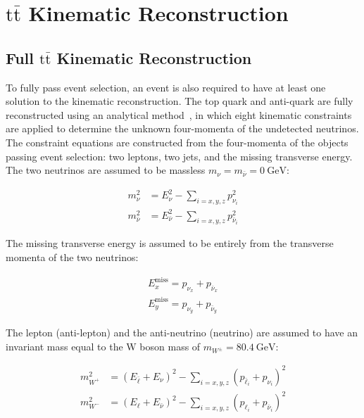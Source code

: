 \clearpage
\section{\ensuremath{\mathrm{t\bar{t}}} Kinematic Reconstruction}

\subsection{Full \ensuremath{\mathrm{t\bar{t}}} Kinematic Reconstruction}
To fully pass event selection, an event is also required to have at least one solution to the \ttbar kinematic reconstruction.
The top quark and anti-quark are fully reconstructed using an analytical method~\cite{Sonnenschein:2006ud}, in which eight kinematic constraints are applied to determine the unknown four-momenta of the undetected neutrinos.
The constraint equations are constructed from the four-momenta of the objects passing event selection: two leptons, two jets, and the missing transverse energy. 
The two neutrinos are assumed to be massless $m_{\nu} = m_{\bar{\nu}} = \SI{0}{\GeV}$:
\begin{linenomath*}
\begin{align}
m_{\nu}^2 &= E_{\nu}^2 - \sum_{i = x, y, z} p_{\nu_i}^2 \\
m_{\bar{\nu}}^2 &= E_{\bar{\nu}}^2 - \sum_{i = x, y, z} p_{\bar{\nu}_i}^2
\end{align}
\end{linenomath*}
The missing transverse energy is assumed to be entirely from the transverse momenta of the two neutrinos:
\begin{linenomath*}
\begin{align}
E_{x}^{\text{miss}}=p_{\nu_x}+p_{\bar{\nu}_x} \\
E_{y}^{\text{miss}}=p_{\nu_y}+p_{\bar{\nu}_y}
\end{align}
\end{linenomath*}
The lepton (anti-lepton) and the anti-neutrino (neutrino) are assumed to have an invariant mass equal to the W boson mass of $m_{W^\pm} = \SI{80.4}{\GeV}$:
\begin{linenomath*}
\begin{align}
m_{W^{+}}^2 &=\left(E_{\bar{\ell}}+E_\nu\right)^2- \sum_{i = x, y, z} \left(p_{\bar{\ell}_i}+p_{\nu_i}\right)^2  \\
m_{W^{-}}^2 &=\left(E_{\ell}+E_{\bar{\nu}}\right)^2- \sum_{i = x, y, z} \left(p_{\ell_i}+p_{\bar{\nu}_i}\right)^2
\end{align}
\end{linenomath*}
